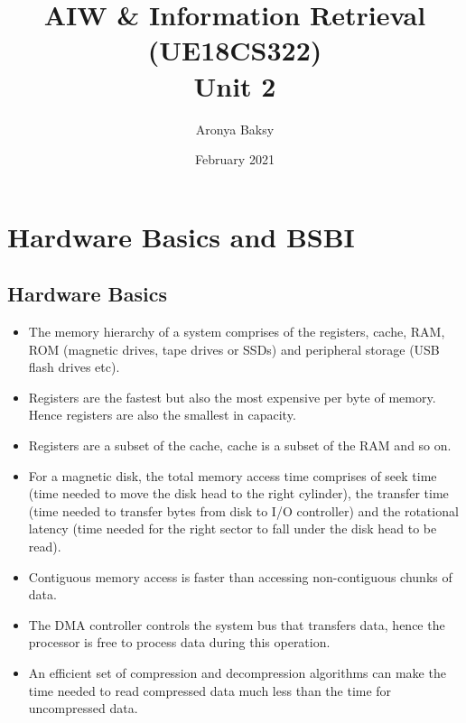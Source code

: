 \documentclass{article}
\title{AIW \& Information Retrieval (UE18CS322)\\Unit 2}
\author{Aronya Baksy}
\date{February 2021}
\begin{document}
\maketitle
\section{Hardware Basics and BSBI}
\subsection{Hardware Basics}
\begin{itemize}
    \item The memory hierarchy of a system comprises of the registers, cache, RAM, ROM (magnetic drives, tape drives or SSDs) and peripheral storage (USB flash drives etc). 
    
    \item Registers are the fastest but also the most expensive per byte of memory. Hence registers are also the smallest in capacity.
    
    \item Registers are a subset of the cache, cache is a subset of the RAM and so on. 
    
    \item For a magnetic disk, the total memory access time comprises of seek time (time needed to move the disk head to the right cylinder), the transfer time (time needed to transfer bytes from disk to I/O controller) and the rotational latency (time needed for the right sector to fall under the disk head to be read). 
    
    \item Contiguous memory access is faster than accessing non-contiguous chunks of data. 
    
    \item The DMA controller controls the system bus that transfers data, hence the processor is free to process data during this operation. 
    
    \item An efficient set of compression and decompression algorithms can make the time needed to read compressed data much less than the time for uncompressed data. 
\end{itemize}
\end{document}
